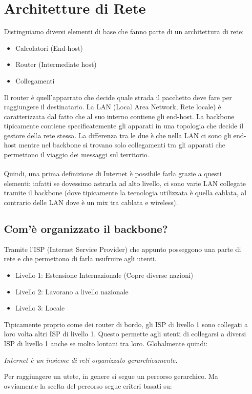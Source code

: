 \documentclass[a4paper]{article}
\begin{document}
\section{Architetture di Rete}

Distinguiamo diversi elementi di base che fanno parte di un architettura di rete:

\begin{itemize}
    \item Calcolatori (End-host)
    \item Router (Intermediate host) 
    \item Collegamenti
\end{itemize}
Il router è quell'apparrato che decide quale strada il pacchetto deve fare per raggiungere il destinatario. La LAN (Local Area Network, Rete locale) è caratterizzata dal fatto che al suo interno contiene gli end-host. La backbone tipicamente contiene specificatemente gli apparati in una topologia che decide il gestore della rete stessa. La differenza tra le due è che nella LAN ci sono gli end-host mentre nel backbone si trovano solo collegamenti tra gli apparati che permettono il viaggio dei messaggi sul territorio.
\\\\
Quindi, una prima definizione di Internet è possibile farla grazie a questi elementi: infatti se dovessimo astrarla ad alto livello, ci sono varie LAN collegate tramite il backbone (dove tipicamente la tecnologia utilizzata è quella cablata, al contrario delle LAN dove è un mix tra cablata e wireless).

\subsection{Com'è organizzato il backbone?}

Tramite l'ISP (Internet Service Provider) che appunto posseggono una parte di rete e che permettono di farla usufruire agli utenti.

\begin{itemize}
    \item Livello 1: Estensione Internazionale (Copre diverse nazioni) 
    \item Livello 2: Lavorano a livello nazionale
    \item Livello 3: Locale
\end{itemize}

Tipicamente proprio come dei router di bordo, gli ISP di livello 1 sono collegati a loro volta altri ISP di livello 1. Questo permette agli utenti di collegarsi a diversi ISP di livello 1 anche se molto lontani tra loro. Globalmente quindi: 
\begin{definition}
  \textit{Internet è un insieme di reti organizzato gerarchicamente.}  
\end{definition}
Per raggiungere un utete, in genere si segue un percorso gerarchico. Ma ovviamente la scelta del percorso segue criteri basati su:
\end{document}
